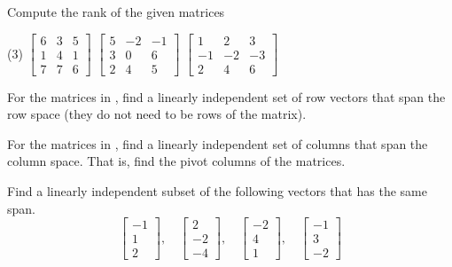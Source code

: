\begin{exercise} \label{exercise:rankmatrix}
Compute the rank of the given matrices
\begin{tasks}(3)
\task
$\begin{bmatrix}
6 & 3 & 5 \\
1 & 4 & 1 \\
7 & 7 & 6
\end{bmatrix}$
\task
$\begin{bmatrix}
5 & -2 & -1 \\
3 & 0 & 6 \\
2 & 4 & 5
\end{bmatrix}$
\task
$\begin{bmatrix}
1 & 2 & 3 \\
-1 & -2 & -3 \\
2 & 4 & 6
\end{bmatrix}$
\end{tasks}
\end{exercise}

\begin{exercise}
For the matrices in , find
a linearly independent set of row vectors that span the row space
(they do not need to be rows of the matrix).
\end{exercise}

\begin{exercise}
For the matrices in , find
a linearly independent set of columns that span the column space.
That is, find the pivot columns of the matrices.
\end{exercise}

\begin{exercise}
Find a linearly independent subset of the following vectors that has
the same span.
\begin{equation*}
\begin{bmatrix}
-1 \\ 1 \\ 2
\end{bmatrix}
, \quad
\begin{bmatrix}
2 \\ -2 \\ -4
\end{bmatrix}
, \quad
\begin{bmatrix}
-2 \\ 4 \\ 1
\end{bmatrix}
, \quad
\begin{bmatrix}
-1 \\ 3 \\ -2
\end{bmatrix}
\end{equation*}
\end{exercise}

